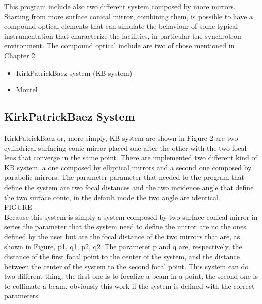 This program include also two different system composed by more mirrors. Starting from more surface conical mirror, combining them, is possible to have a compound optical elements that can simulate the behaviour of some typical instrumentation that characterize the facilities, in particular the synchrotron environment. The compound optical include are two of those mentioned in Chapter 2
\begin{itemize}
\item KirkPatrickBaez system (KB system)
\item Montel
\end{itemize}

\subsection{KirkPatrickBaez System}
KirkPatrickBaez or, more simply, KB system are shown in Figure 2 are two cylindrical surfacing conic mirror placed one after the other with the two focal lens that converge in the same point. There are implemented two different kind of KB system, a one composed by elliptical mirrors and a second one composed by parabolic mirrors. The parameter parameter that needed to the program that define the system are two focal distances and the two incidence angle that define the two surface conic, in the default mode the two angle are identical.
\\
FIGURE
\\
Because this system is simply a system composed by two surface conical mirror in series the parameter that the system need to define the mirror are no the ones defined by the user but are the focal distance of the two mirrors that are, as shown in Figure, p1, q1, p2, q2. The parameter p and q are, respectively, the distance of the first focal point to the center of the system, and the distance between the center of the system to the second focal point. This system can do two different thing, the first one is to focalize a beam in a point, the second one is to collimate a beam, obviously this work if the system is defined with the correct parameters.
